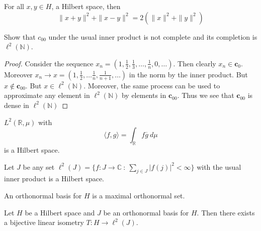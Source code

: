 \begin{proposition}
  For all $x, y \in H$, a Hilbert space, then \[
    \|x + y\|^2 + \|x-y\|^2  = 2(\|x\|^2 + \|y\|^2)
  \]
\end{proposition}

\begin{example}
  Show that $c_{00}$ under the usual inner product is not complete
  and its completion is $\ell^2(\mathbb{N})$.
\end{example}
\begin{proof}
  Consider the sequence $x_n = (1, \frac{1}{2}, \frac{1}{3}, \ldots,
    \frac{1}{n}, 0,
  \ldots)$. Then clearly $x_n \in \textbf{c}_0$. Moreover $x_n \to x
  = (1, \frac{1}{2}, \ldots \frac{1}{n}, \frac{1}{n+1}, \ldots)$ in
  the norm by the inner product. But $x \notin \textbf{c}_{00}$. But $ x
  \in \ell^2(\mathbb{N})$. Moreover, the same process can be used to
  approximate any  element in $\ell^2(\mathbb{N})$ by elements in
  $\textbf{c}_{00}$. Thus we see that $ \textbf{c}_{00}$ is dense in
  $\ell^{2}(\mathbb{N})$
\end{proof}

\begin{example}
  $L^2(\mathbb{R},  \mu)$ with \[
    \langle f , g \rangle  = \int_\mathbb{R}  f \overline{g} \ d \mu
  \]
  is a Hilbert space.
\end{example}

\begin{example}
  Let $J$ be any set $\ell^2(J) = \{  f: J \to \mathbb{C}  \ : \
  \sum_{j \in J} |f(j)|^2 < \infty  \}$ with the usual inner product
  is a Hilbert space.
\end{example}

\begin{definition}
  An orthonormal basis for $H$ is a maximal orthonormal set.
\end{definition}

\begin{theorem}
  Let $H$ be a Hilbert space and $J$ be an orthonormal basis for $H$.
  Then there exists a bijective linear isometry $T : H \to \ell^2(J)$.
\end{theorem}

